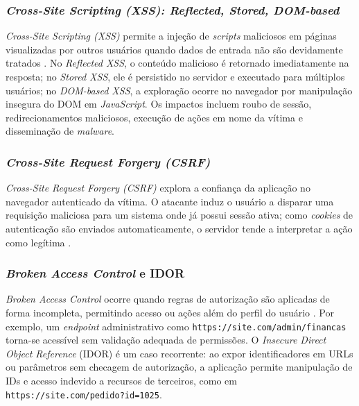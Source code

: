 \subsubsection{
    \textit{Cross-Site Scripting (XSS): Reflected, Stored, DOM-based}
}
\textit{Cross-Site Scripting (XSS)} permite a injeção de \textit{scripts} maliciosos em páginas visualizadas por outros usuários quando dados de entrada não são devidamente tratados \cite{Sarmah2018SurveyXSSDetection}. No \textit{Reflected XSS}, o conteúdo malicioso é retornado imediatamente na resposta; no \textit{Stored XSS}, ele é persistido no servidor e executado para múltiplos usuários; no \textit{DOM-based XSS}, a exploração ocorre no navegador por manipulação insegura do DOM em \textit{JavaScript}. Os impactos incluem roubo de sessão, redirecionamentos maliciosos, execução de ações em nome da vítima e disseminação de \textit{malware}.

\subsubsection{
    \textit{Cross-Site Request Forgery (CSRF)}
}

\textit{Cross-Site Request Forgery (CSRF)} explora a confiança da aplicação no navegador autenticado da vítima. O atacante induz o usuário a disparar uma requisição maliciosa para um sistema onde já possui sessão ativa; como \textit{cookies} de autenticação são enviados automaticamente, o servidor tende a interpretar a ação como legítima \cite{Lin2009ThreatModelingCSRF}. 

\subsubsection{
    \textit{Broken Access Control} e IDOR
}

\textit{Broken Access Control} ocorre quando regras de autorização são aplicadas de forma incompleta, permitindo acesso ou ações além do perfil do usuário \cite{Kusnana2025IDORBrokenAccess}. Por exemplo, um \textit{endpoint} administrativo como \verb|https://site.com/admin/financas| torna-se acessível sem validação adequada de permissões. O \textit{Insecure Direct Object Reference} (IDOR) é um caso recorrente: ao expor identificadores em URLs ou parâmetros sem checagem de autorização, a aplicação permite manipulação de IDs e acesso indevido a recursos de terceiros, como em \verb|https://site.com/pedido?id=1025|.


